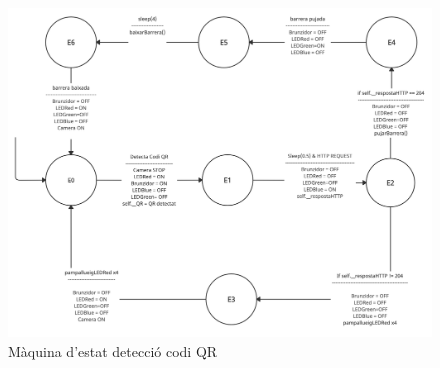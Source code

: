 \begin{figure}[H]
\begin{center}
    \includegraphics[scale=0.15]{Fotos/barrera.png}
\end{center}
\caption{Màquina d'estat detecció codi QR}
\label{fig:maq_estats}
\end{figure}

